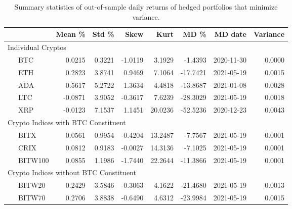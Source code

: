 \documentclass[11pt,a4paper,english]{article}
\begin{document}
\clearpage
\newpage
{\small %
  \begin{table}[h] \centering %
    {%
\begin{tabular}{lrrrrrrr} \toprule
         {} &    Mean \% &     Std \% &      Skew &       Kurt &         MD \% &     MD date & Variance \\
\midrule
     \multicolumn{7}{l}{Individual Cryptos}                                                                                 \\
\ \ \ BTC     &  0.0215 &  0.3221 & -1.0119 &   3.1929 &  -1.4393 &  2020-11-30 &    0.0000 \\
\ \ \ ETH     &  0.2823 &  3.8741 &  0.9469 &   7.1064 & -17.7421 &  2021-05-19 &    0.0015 \\
\ \ \ ADA     &  0.5617 &  5.2722 &  1.3634 &   4.4818 & -13.8687 &  2021-01-08 &    0.0028 \\
\ \ \ LTC     & -0.0871 &  3.9052 & -0.3617 &   7.6239 & -28.3029 &  2021-05-19 &    0.0018 \\
\ \ \ XRP     & -0.0123 &  7.1537 &  1.1451 &  20.0236 & -52.5236 &  2020-12-23 &    0.0043 \\
   \multicolumn{7}{l}{Crypto Indices with BTC Constituent}                                                                  \\
\ \ \ BITX    &  0.0561 &  0.9954 & -0.4204 &  13.2487 &  -7.7567 &  2021-05-19 &    0.0001 \\
\ \ \ CRIX    &  0.0812 &  0.9183 & -0.0027 &  14.3136 &  -7.1025 &  2021-05-19 &    0.0001 \\
\ \ \ BITW100 &  0.0855 &  1.1986 & -1.7440 &  22.2644 & -11.3866 &  2021-05-19 &    0.0001 \\
    \multicolumn{7}{l}{Crypto Indices without BTC Constituent}                                                              \\
\ \ \ BITW20  &  0.2429 &  3.5846 & -0.3063 &   4.1622 & -21.4680 &  2021-05-19 &    0.0013 \\
\ \ \ BITW70  &  0.2706 &  3.8838 & -0.6490 &   4.6312 & -23.9984 &  2021-05-19 &    0.0015 \\
\bottomrule
\end{tabular}}
\caption{Summary statistics of out-of-sample daily returns of hedged portfolios that minimize variance.}
\label{tab:var_rh}


\end{table}}
\end{document}
